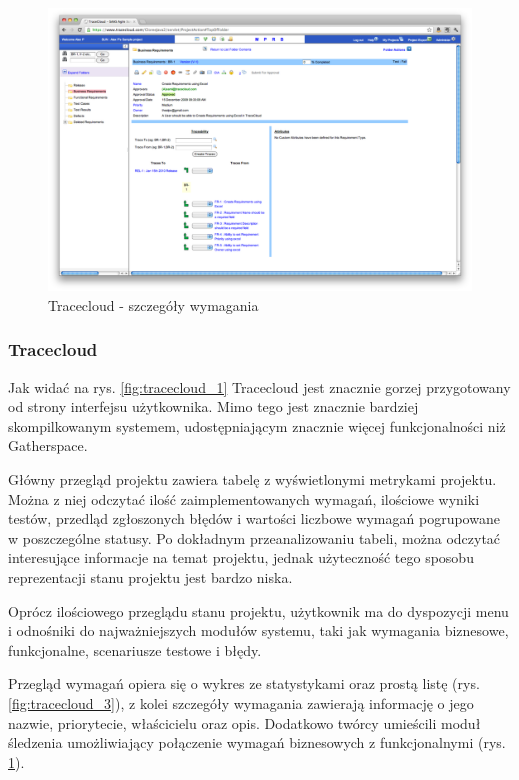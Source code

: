         \begin{figure}[t]
          \centering
          \includegraphics[width=1.0\textwidth]{img/tracecloud_4.pdf}
          \caption{Tracecloud - szczegóły wymagania}
          \label{fig:tracecloud_4}
        \end{figure}

      \subsubsection{Tracecloud}
        
        Jak widać na rys. \ref{fig:tracecloud_1} Tracecloud jest znacznie gorzej przygotowany od strony interfejsu użytkownika. Mimo tego jest znacznie bardziej skompilkowanym systemem, udostępniającym znacznie więcej funkcjonalności niż Gatherspace.

        Główny przegląd projektu zawiera tabelę z wyświetlonymi metrykami projektu. Można z niej odczytać ilość zaimplementowanych wymagań, ilościowe wyniki testów, przedląd zgłoszonych błędów i wartości liczbowe wymagań pogrupowane w poszczególne statusy. Po dokładnym przeanalizowaniu tabeli, można odczytać interesujące informacje na temat projektu, jednak użyteczność tego sposobu reprezentacji stanu projektu jest bardzo niska. 

        Oprócz ilościowego przeglądu stanu projektu, użytkownik ma do dyspozycji menu i odnośniki do najważniejszych modułów systemu, taki jak wymagania biznesowe, funkcjonalne, scenariusze testowe i błędy.

        Przegląd wymagań opiera się o wykres ze statystykami oraz prostą listę (rys. \ref{fig:tracecloud_3}), z kolei szczegóły wymagania zawierają informację o jego nazwie, priorytecie, właścicielu oraz opis. Dodatkowo twórcy umieścili moduł śledzenia umożliwiający połączenie wymagań biznesowych z funkcjonalnymi (rys. \ref{fig:tracecloud_4}).
    
